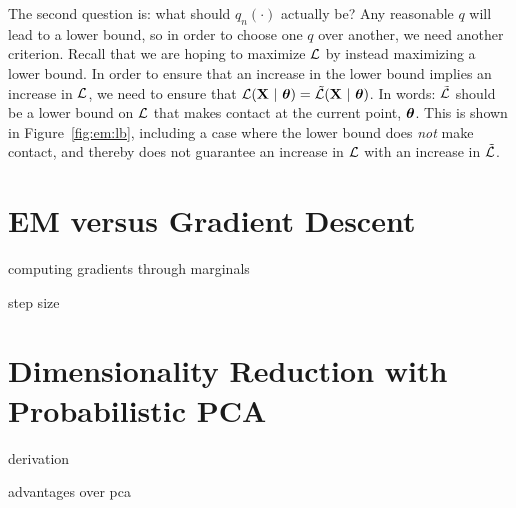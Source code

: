 The second question is: what should $q_n(\cdot)$ actually be?  Any
reasonable $q$ will lead to a lower bound, so in order to choose one
$q$ over another, we need another criterion.  Recall that we are
hoping to maximize $\mathcal{L}$ by instead maximizing a lower bound.  In
order to ensure that an increase in the lower bound implies an
increase in $\mathcal{L}$, we need to ensure that $\mathcal{L}(\text{\bf X} \textrm{~}\arrowvert\textrm{~} {\boldsymbol{\theta}}) =
\tilde{\mathcal{L}}(\text{\bf X} \textrm{~}\arrowvert\textrm{~} {\boldsymbol{\theta}})$.  In words: $\tilde{\mathcal{L}}$ should be a lower
bound on $\mathcal{L}$ that makes contact at the current point, ${\boldsymbol{\theta}}$.  This
is shown in Figure~\ref{fig:em:lb}, including a case where the lower
bound does \emph{not} make contact, and thereby does not guarantee an
increase in $\mathcal{L}$ with an increase in $\tilde{\mathcal{L}}$.

\section{EM versus Gradient Descent}

computing gradients through marginals

step size

\section{Dimensionality Reduction with Probabilistic PCA}

derivation

advantages over pca

\begin{comment}
   - Latent variable models (versus parameters)
   - Marginalization, expectations
   - Gaussian mixture models as naive Bayes without labels
   - Expectation maximization in general
   - EM vs gradient descent
   - ``hard'' em
\end{comment}


